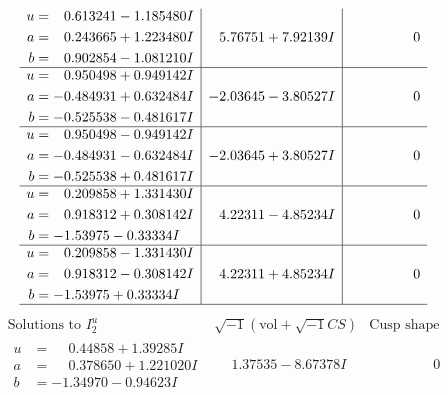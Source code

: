 \documentclass[1p]{elsarticle_modified}
\theoremstyle{definition}
\newcommand{\I}{\sqrt{-1}}
\begin{document}
$$\begin{array}{c|c|c}
\begin{aligned}
u &= \phantom{-}0.613241 - 1.185480 I \\
a &= \phantom{-}0.243665 + 1.223480 I \\
b &= \phantom{-}0.902854 - 1.081210 I\end{aligned}
 & \phantom{-}5.76751 + 7.92139 I & \phantom{-0.000000 } 0 \\ \hline\begin{aligned}
u &= \phantom{-}0.950498 + 0.949142 I \\
a &= -0.484931 + 0.632484 I \\
b &= -0.525538 - 0.481617 I\end{aligned}
 & -2.03645 - 3.80527 I & \phantom{-0.000000 } 0 \\ \hline\begin{aligned}
u &= \phantom{-}0.950498 - 0.949142 I \\
a &= -0.484931 - 0.632484 I \\
b &= -0.525538 + 0.481617 I\end{aligned}
 & -2.03645 + 3.80527 I & \phantom{-0.000000 } 0 \\ \hline\begin{aligned}
u &= \phantom{-}0.209858 + 1.331430 I \\
a &= \phantom{-}0.918312 + 0.308142 I \\
b &= -1.53975 - 0.33334 I\end{aligned}
 & \phantom{-}4.22311 - 4.85234 I & \phantom{-0.000000 } 0 \\ \hline\begin{aligned}
u &= \phantom{-}0.209858 - 1.331430 I \\
a &= \phantom{-}0.918312 - 0.308142 I \\
b &= -1.53975 + 0.33334 I\end{aligned}
 & \phantom{-}4.22311 + 4.85234 I & \phantom{-0.000000 } 0\\
 \hline 
 \end{array}$$\newpage$$\begin{array}{c|c|c}  
\text{Solutions to }I^u_{2}& \I (\text{vol} + \sqrt{-1}CS) & \text{Cusp shape}\\
 \hline 
\begin{aligned}
u &= \phantom{-}0.44858 + 1.39285 I \\
a &= \phantom{-}0.378650 + 1.221020 I \\
b &= -1.34970 - 0.94623 I\end{aligned}
 & \phantom{-}1.37535 - 8.67378 I & \phantom{-0.000000 } 0 \\ \hline\begin{aligned}

\end{aligned}
\end{array}$$
\end{document}
